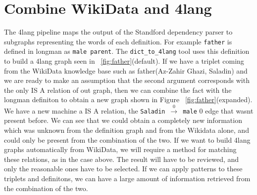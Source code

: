 \documentclass[twoside,b5paper,10pt]{article}
\begin{document}
\section{Combine WikiData and 4lang}
\label{sec:Combine WikiData and 4lang}
The 4lang pipeline maps the output of the Standford dependency parser to subgraphs representing the words of each definition.  
For example \texttt{father} is defined in longman as \texttt{male parent}. 
The \verb|dict_to_4lang| tool uses this definition to build a 4lang graph seen in \figurename~\ref{fig:father}(default). 
If we have a triplet coming from the WikiData knowledge base such as father(Az-Zahir Ghazi, Saladin) and we are ready to make 
an assumption that the second argument corresponds with the only IS A relation of out graph, then we can combine the fact with 
the longman definiton to obtain a new graph shown in Figure \figurename~\ref{fig:father}(expanded). We have a new machine a IS A relation, the 
\texttt{Saladin}~$\xrightarrow0$~\texttt{male} 0 edge that wasnt present before. We can see that we could obtain a completely 
new information which was unknown from the definition graph and from the Wikidata alone, and could only be present from the combination
of the two. If we want to build 4lang graphs automatically from WikiData, we will require a method for matching these relations, as in the case above. 
The result will have to be reviewed, and only the reasonable ones have to be selected. If we can apply patterns to these triplets and definitons, 
we can have a large amount of information retrieved from the combination of the two.
\end{document}
